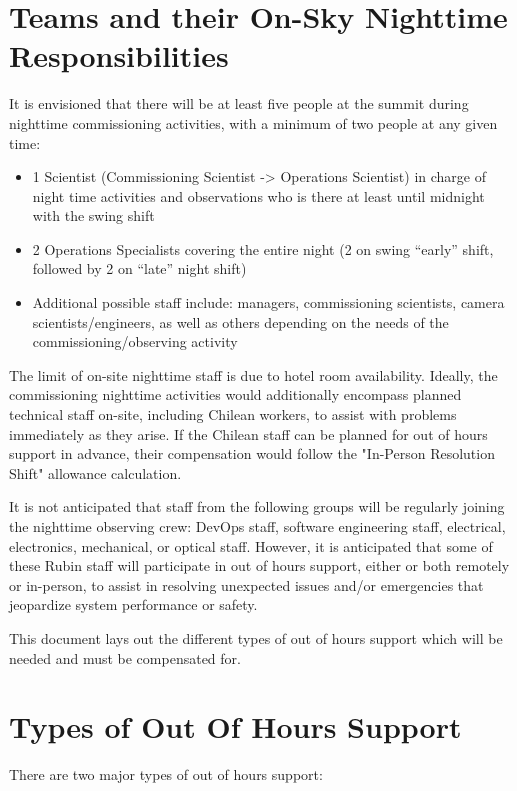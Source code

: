 \section{Teams and their On-Sky Nighttime Responsibilities}

It is envisioned that there will be at least five people at the summit during nighttime commissioning activities, with a minimum of two people at any given time:

\begin{itemize}
    \item 1 Scientist (Commissioning Scientist -> Operations Scientist) in charge of night time activities and observations who is there at least until midnight with the swing shift
    \item 2 Operations Specialists covering the entire night (2 on swing ``early'' shift, followed by 2 on ``late'' night shift)
    \item Additional possible staff include: managers, commissioning scientists, camera scientists/engineers, as well as others depending on the needs of the commissioning/observing activity
\end{itemize}

The limit of on-site nighttime staff is due to hotel room availability.  
Ideally, the commissioning nighttime activities would additionally encompass planned technical staff on-site, including Chilean workers, to assist with problems immediately as they arise.  
If the Chilean staff can be planned for out of hours support in advance, their compensation would follow the "In-Person Resolution Shift" allowance calculation.

It is not anticipated that staff from the following groups will be regularly joining the nighttime observing crew: DevOps staff, software engineering staff, electrical, electronics, mechanical, or optical staff.
However, it is anticipated that some of these Rubin staff will participate in out of hours support, either or both remotely or in-person, to assist in resolving unexpected issues and/or emergencies that jeopardize system performance or safety.

This document lays out the different types of out of hours support which will be needed and must be compensated for.

\section{Types of Out Of Hours Support}

There are two major types of out of hours support:

